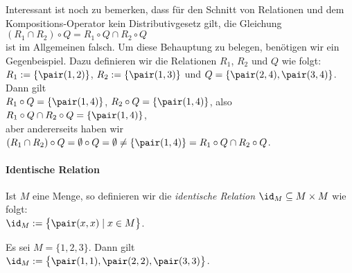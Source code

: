 Interessant ist noch zu bemerken, dass f\"{u}r den Schnitt von Relationen
und dem Kompositions-Operator kein Distributivgesetz gilt, die Gleichung
\\[0.2cm]
\hspace*{1.3cm}
$(R_1 \cap R_2) \circ Q = R_1 \circ Q \cap R_2 \circ Q$
\\[0.2cm]
ist im Allgemeinen falsch.  Um diese Behauptung zu belegen, ben\"{o}tigen wir ein Gegenbeispiel.
Dazu definieren wir die Relationen $R_1$, $R_2$ und $Q$ wie folgt: \\[0.2cm]
\hspace*{1.3cm} $R_1 := \{ \pair(1,2) \}$, \quad $R_2 := \{ \pair(1,3) \}$ \quad und \quad
                $Q = \{ \pair(2,4), \pair(3,4) \}$. \\[0.2cm]
Dann gilt \\[0.2cm]
\hspace*{1.3cm} $R_1 \circ Q = \{ \pair(1,4) \}$, \quad $R_2 \circ Q = \{ \pair(1,4) \}$, \quad also
                $R_1 \circ Q \cap R_2 \circ Q = \{ \pair(1,4) \}$, \\[0.2cm]
aber andererseits haben wir \\[0.2cm]
\hspace*{1.3cm} $(R_1 \cap R_2) \circ Q  = \emptyset \circ Q = \emptyset \not= \{\pair(1,4) \} = R_1 \circ Q  \cap R_2 \circ Q$. 

\paragraph{Identische Relation} Ist $M$ eine Menge, so definieren wir die \emph{identische Relation} $\id_M \subseteq M \times M$
wie folgt: \\[0.2cm]
\hspace*{1.3cm} $\id_M := \bigl\{ \pair(x,x) \mid x \in M \bigr\}$. 
\vspace*{0.2cm}

\example
Es sei $M = \{1,2,3\}$.  Dann gilt \\[0.2cm]
\hspace*{1.3cm}  $\id_M := \bigl\{ \pair(1,1),  \pair(2,2),  \pair(3,3) \bigr\}$.
\vspace*{0.2cm}

